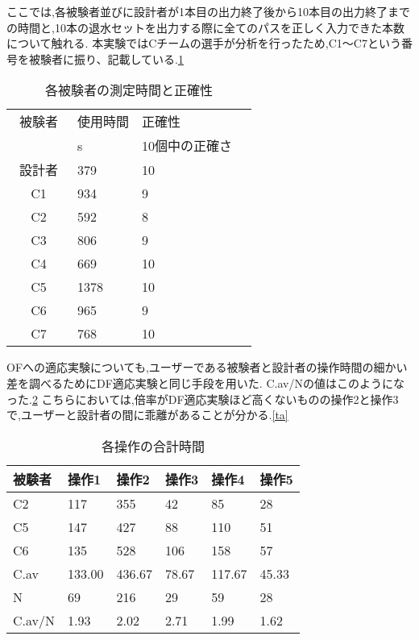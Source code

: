 \documentclass[../main.tex]{subfiles}
\begin{document}
ここでは,各被験者並びに設計者が1本目の出力終了後から10本目の出力終了までの時間と,10本の退水セットを出力する際に全てのパスを正しく入力できた本数について触れる.
本実験ではCチームの選手が分析を行ったため,C1〜C7という番号を被験者に振り、記載している.\ref{table:高校生の時間と正確性}

\begin{table}[h]
    \caption{各被験者の測定時間と正確性}\label{table:高校生の時間と正確性}
    \centering
    \begin{tabular}{clll}
      \hline \hline
      被験者 & 使用時間 & 正確性 \\
      & s & 10個中の正確さ \\
      \hline \hline
      設計者　&  379  & 10 \\
      C1 & 934 & 9 \\
      C2 & 592 & 8 \\
      C3 & 806 & 9 \\
      C4 & 669 & 10 \\
      C5 & 1378 & 10 \\
      C6 & 965 & 9 \\
      C7 & 768 & 10 \\
      \hline
    \end{tabular}
  \end{table}


OFへの適応実験についても,ユーザーである被験者と設計者の操作時間の細かい差を調べるためにDF適応実験と同じ手段を用いた.
C.av/Nの値はこのようになった.\ref{table:各操作時間高校生}
こちらにおいては,倍率がDF適応実験ほど高くないものの操作2と操作3で,ユーザーと設計者の間に乖離があることが分かる.\ref{ta}

\begin{table}[h]
  \caption{各操作の合計時間}\label{table:各操作時間高校生}\centering
    \begin{tabular}{llllll}
    \hline \hline
    被験者 & 操作1  & 操作2 & 操作3 & 操作4 & 操作5  \\
    \hline \hline
    C2 & 117 & 355 & 42 & 85 & 28\\
    C5 & 147 & 427 & 88 & 110 & 51\\
    C6 & 135 & 528 & 106 & 158 & 57 \\
    C.av & 133.00 &436.67 & 78.67 & 117.67 &45.33\\
    N & 69 & 216 & 29 & 59 & 28 \\
    \hline
    C.av/N & 1.93 & 2.02 & 2.71 & 1.99 & 1.62 \\
    \hline
    \end{tabular}
\end{table}
    
\end{document}
